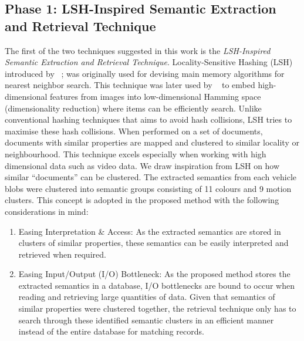 \subsection{Phase 1: LSH-Inspired Semantic Extraction and Retrieval Technique}
\label{subsec:lsh-intro}
The first of the two techniques suggested in this work is the \textit{LSH-Inspired Semantic Extraction and Retrieval Technique}. Locality-Sensitive Hashing (LSH) introduced by ~; was originally used for devising main memory algorithms for nearest neighbor search. This technique was later used by ~ to embed high-dimensional features from images into low-dimensional Hamming space (dimensionality reduction) where items can be efficiently search. 
Unlike conventional hashing techniques that aims to avoid hash collisions, LSH tries to maximise these hash collisions. When performed on a set of documents, documents with similar properties are mapped and clustered to similar locality or neighbourhood. This technique excels especially when working with high dimensional data such as video data.
We draw inspiration from LSH on how similar ``documents'' can be clustered. %
The extracted semantics from each vehicle blobs were clustered into semantic groups consisting of 11 colours and 9 motion clusters. This concept is adopted in the proposed method with the following considerations in mind:
\begin{enumerate}
    \item Easing Interpretation \& Access: As the extracted semantics are stored in clusters of similar properties, these semantics can be easily interpreted and retrieved when required.
    \item Easing Input/Output (I/O) Bottleneck: As the proposed method stores the extracted semantics in a database, I/O bottlenecks are bound to occur when reading and retrieving large quantities of data. Given that semantics of similar properties were clustered together, the retrieval technique only has to search through these identified semantic clusters in an efficient manner instead of the entire database for matching records.
\end{enumerate}


